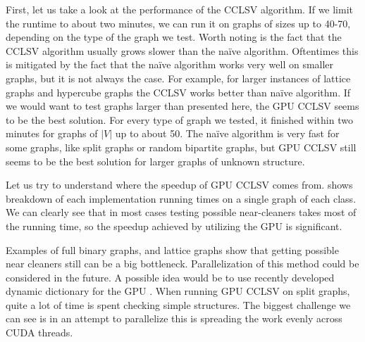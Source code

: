 First, let us take a look at the performance of the CCLSV algorithm. If we limit the runtime to about two minutes, we can run it on graphs of sizes up to 40-70, depending on the type of the graph we test. Worth noting is the fact that the CCLSV algorithm usually grows slower than the na\"ive algorithm. Oftentimes this is mitigated by the fact that the na\"ive algorithm works very well on smaller graphs, but it is not always the case. For example, for larger instances of lattice graphs and hypercube graphs the CCLSV works better than na\"ive algorithm. If we would want to test graphs larger than presented here, the GPU CCLSV seems to be the best solution. For every type of graph we tested, it finished within two minutes for graphs of $|V|$ up to about 50. The na\"ive algorithm is very fast for some graphs, like split graphs or random bipartite graphs, but GPU CCLSV still seems to be the best solution for larger graphs of unknown structure.

Let us try to understand where the speedup of GPU CCLSV comes from.  shows breakdown of each implementation running times on a single graph of each class. We can clearly see that in most cases testing possible near-cleaners takes most of the running time, so the speedup achieved by utilizing the GPU is significant. 

Examples of full binary graphs, and lattice graphs show that getting possible near cleaners still can be a big bottleneck. Parallelization of this method could be considered in the future. A possible idea would be to use recently developed dynamic dictionary for the GPU \cite{Ashkiani2018}. When running GPU CCLSV on split graphs, quite a lot of time is spent checking simple structures. The biggest challenge we can see is in an attempt to parallelize this is spreading the work evenly across CUDA threads.



